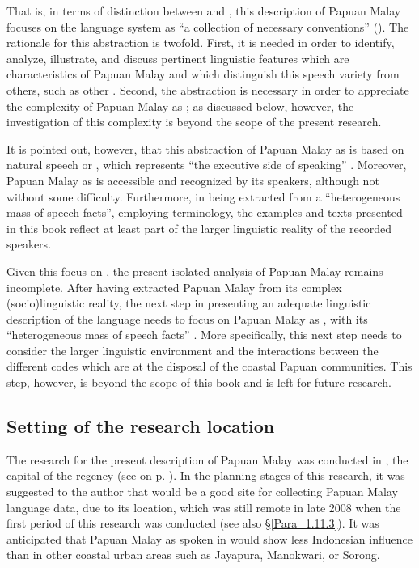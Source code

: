 {That is, in terms of   distinction between  and , this description of Papuan Malay focuses on the language system as  ``a collection of necessary conventions'' (\citeyear*[9]{deSaussure.1959}). The rationale for this abstraction is twofold. First, it is needed in order to identify, analyze, illustrate, and discuss pertinent linguistic features which are characteristics of Papuan Malay and which distinguish this speech variety from others, such as other . Second, the abstraction is necessary in order to appreciate the complexity of Papuan Malay as ; as discussed below, however, the investigation of this complexity is beyond the scope of the present research.



It is pointed out, however, that this abstraction of Papuan Malay as  is based on natural speech or , which represents  ``the executive side of speaking'' \citep[13, 14]{deSaussure.1959}. Moreover, Papuan Malay as  is accessible and recognized by its speakers, although not without some difficulty. Furthermore, in being extracted from a  ``heterogeneous mass of speech facts'', employing  terminology, the examples and texts presented in this book reflect at least part of the larger linguistic reality of the recorded speakers.



Given this focus on , the present isolated analysis of Papuan Malay remains incomplete. After having extracted Papuan Malay from its complex (socio)linguistic reality, the next step in presenting an adequate linguistic description of the language needs to focus on Papuan Malay as , with its  ``heterogeneous mass of speech facts'' \citep[14]{deSaussure.1959}. More specifically, this next step needs to consider the larger linguistic environment and the interactions between the different codes which are at the disposal of the coastal Papuan communities. This step, however, is beyond the scope of this book and is left for future research.


\subsection{Setting of the research location}\label{Para_1.11.2}
The research for the present description of Papuan Malay was conducted in , the capital of the  regency (see  on p. \pageref{Figure_0.3}). In the planning stages of this research, it was suggested to the author that  would be a good site for collecting Papuan Malay language data, due to its location, which was still remote in late 2008 when the first period of this research was conducted (see also §\ref{Para_1.11.3}). It was anticipated that Papuan Malay as spoken in  would show less Indonesian influence than in other coastal urban areas such as Jayapura, Manokwari, or Sorong.



}
